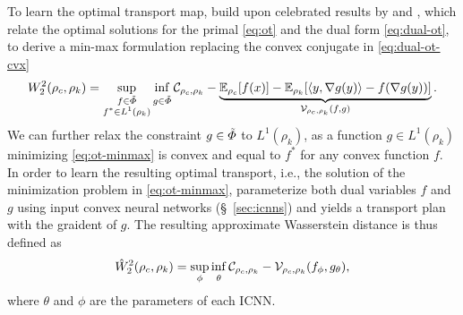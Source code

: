 To learn the optimal transport map, \citeauthor{makkuva2020optimal} build upon celebrated results by \citet{knott1984optimal} and \citet{brenier1991polar}, which relate the optimal solutions for the primal \eqref{eq:ot} and the dual form \eqref{eq:dual-ot}, to derive a min-max formulation replacing the convex conjugate in \eqref{eq:dual-ot-cvx} \citep[Theorem 3.3]{makkuva2020optimal}
\begin{equation} \label{eq:ot-minmax}
    W_{2}^2(\rho_c, \rho_k)=\sup _{\substack{f \in \Tilde{\Phi} \\ f^{*} \in L^{1}(\rho_k)}} \newinf _{g \in \Tilde{\Phi}}  \mathcal{C}_{\rho_c, \rho_k} - \underbrace{\mathbb{E}_{\rho_c}[f(x)]-\mathbb{E}_{\rho_k}[\langle y, \nabla g(y)\rangle-f(\nabla g(y))]}_{\mathcal{V}_{\rho_c, \rho_k}(f, g)}.
\end{equation}
We can further relax the constraint $g \in \Tilde{\Phi}$ to $L^{1}(\rho_k)$, as a function $g \in L^{1}(\rho_k)$ minimizing \eqref{eq:ot-minmax} is convex and equal to $f^*$ for any convex function $f$.
In order to learn the resulting optimal transport, i.e., the solution of the minimization problem in \eqref{eq:ot-minmax}, \citet{makkuva2020optimal} parameterize both dual variables $f$ and $g$ using input convex neural networks (\S~\ref{sec:icnns}) \citep{amos2017input} and yields a transport plan with the graident of $g$.
The resulting approximate Wasserstein distance is thus defined as
\begin{equation} \label{eq:cellot-optim}
    \hat{W}_2^2(\rho_c, \rho_k) = \sup _{\phi} \newinf_{\theta}  \mathcal{C}_{\rho_c, \rho_k} - \mathcal{V}_{\rho_c, \rho_k}(f_{\phi}, g_{\theta}),
\end{equation}
where $\theta$ and $\phi$ are the parameters of each ICNN.



